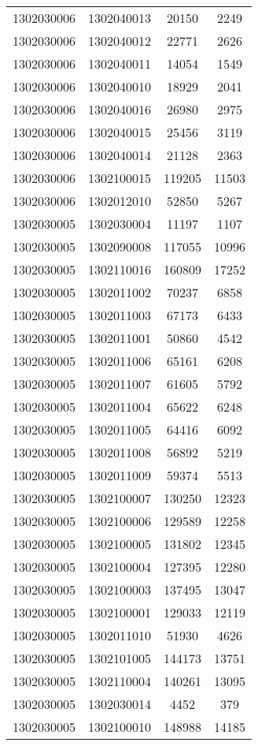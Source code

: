 \begin{longtable}{llcc}
1302030006 & 1302040013 & 20150 & 2249\\
1302030006 & 1302040012 & 22771 & 2626\\
1302030006 & 1302040011 & 14054 & 1549\\
1302030006 & 1302040010 & 18929 & 2041\\
1302030006 & 1302040016 & 26980 & 2975\\
1302030006 & 1302040015 & 25456 & 3119\\
1302030006 & 1302040014 & 21128 & 2363\\
1302030006 & 1302100015 & 119205 & 11503\\
1302030006 & 1302012010 & 52850 & 5267\\
1302030005 & 1302030004 & 11197 & 1107\\
1302030005 & 1302090008 & 117055 & 10996\\
1302030005 & 1302110016 & 160809 & 17252\\
1302030005 & 1302011002 & 70237 & 6858\\
1302030005 & 1302011003 & 67173 & 6433\\
1302030005 & 1302011001 & 50860 & 4542\\
1302030005 & 1302011006 & 65161 & 6208\\
1302030005 & 1302011007 & 61605 & 5792\\
1302030005 & 1302011004 & 65622 & 6248\\
1302030005 & 1302011005 & 64416 & 6092\\
1302030005 & 1302011008 & 56892 & 5219\\
1302030005 & 1302011009 & 59374 & 5513\\
1302030005 & 1302100007 & 130250 & 12323\\
1302030005 & 1302100006 & 129589 & 12258\\
1302030005 & 1302100005 & 131802 & 12345\\
1302030005 & 1302100004 & 127395 & 12280\\
1302030005 & 1302100003 & 137495 & 13047\\
1302030005 & 1302100001 & 129033 & 12119\\
1302030005 & 1302011010 & 51930 & 4626\\
1302030005 & 1302101005 & 144173 & 13751\\
1302030005 & 1302110004 & 140261 & 13095\\
1302030005 & 1302030014 & 4452 & 379\\
1302030005 & 1302100010 & 148988 & 14185\\

\end{longtable}
